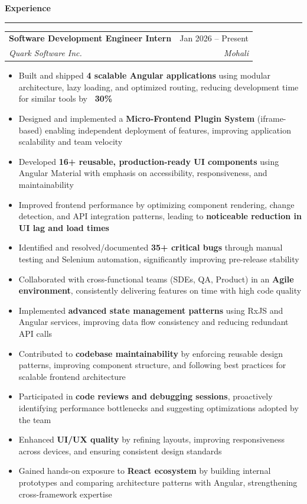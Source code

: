 \documentclass[10pt, letterpaper]{article}
\makeatletter
\newcommand{\resumesection}[1]{
    \vspace{6pt}
    {\large \textbf{\textcolor{accent}{#1}}}
    \vspace{1pt}\hrule
    \vspace{4pt}
}
\newcommand{\experience}[4]{
    \begin{tabularx}{\textwidth}{@{} X r @{}}
        \textbf{#1} & #2 \\
        \textit{#3} & \textit{#4} \\
    \end{tabularx}
}
\makeatother
\begin{document}
\resumesection{Experience}
\experience{Software Development Engineer Intern}{Jan 2026 -- Present}
{Quark Software Inc.}{Mohali}
\begin{itemize}
    \item Built and shipped \textbf{4 scalable Angular applications} using modular architecture, lazy loading, and optimized routing, reducing development time for similar tools by \textbf{~30\%}
    
    \item Designed and implemented a \textbf{Micro-Frontend Plugin System} (iframe-based) enabling independent deployment of features, improving application scalability and team velocity
    
    \item Developed \textbf{16+ reusable, production-ready UI components} using Angular Material with emphasis on accessibility, responsiveness, and maintainability
    
    \item Improved frontend performance by optimizing component rendering, change detection, and API integration patterns, leading to \textbf{noticeable reduction in UI lag and load times}
    
    \item Identified and resolved/documented \textbf{35+ critical bugs} through manual testing and Selenium automation, significantly improving pre-release stability
    
    \item Collaborated with cross-functional teams (SDEs, QA, Product) in an \textbf{Agile environment}, consistently delivering features on time with high code quality
    
    \item Implemented \textbf{advanced state management patterns} using RxJS and Angular services, improving data flow consistency and reducing redundant API calls
    
    \item Contributed to \textbf{codebase maintainability} by enforcing reusable design patterns, improving component structure, and following best practices for scalable frontend architecture
    
    \item Participated in \textbf{code reviews and debugging sessions}, proactively identifying performance bottlenecks and suggesting optimizations adopted by the team
    
    \item Enhanced \textbf{UI/UX quality} by refining layouts, improving responsiveness across devices, and ensuring consistent design standards
    
    \item Gained hands-on exposure to \textbf{React ecosystem} by building internal prototypes and comparing architecture patterns with Angular, strengthening cross-framework expertise
\end{itemize}
\end{document}
